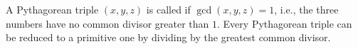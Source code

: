 A Pythagorean triple $(x, y, z)$ is called  if $\gcd(x, y, z) = 1$, i.e., the three numbers have no common divisor greater than $1$. Every Pythagorean triple can be reduced to a primitive one by dividing by the greatest common divisor.
